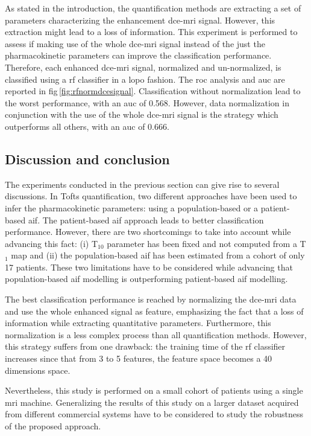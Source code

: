As stated in the introduction, the quantification methods are extracting a set of parameters characterizing the enhancement \ac{dce}-\ac{mri} signal.
However, this extraction might lead to a loss of information.
This experiment is performed to assess if making use of the whole \ac{dce}-\ac{mri} signal instead of the just the pharmacokinetic parameters can improve the classification performance.
Therefore, each enhanced \ac{dce}-\ac{mri} signal, normalized and un-normalized, is classified using a \ac{rf} classifier in a \ac{lopo} fashion.
The \ac{roc} analysis and \ac{auc} are reported in \acs{fig}\,\ref{fig:rfnormdcesignal}.
Classification without normalization lead to the worst performance, with an \ac{auc} of 0.568.
However, data normalization in conjunction with the use of the whole \ac{dce}-\ac{mri} signal is the strategy which outperforms all others, with an \ac{auc} of 0.666.


\subsection{Discussion and conclusion}\label{subsec:chp5:DCE-norm:dis-con}

The experiments conducted in the previous section can give rise to several discussions.
In Tofts quantification, two different approaches have been used to infer the pharmacokinetic parameters: using a population-based or a patient-based \ac{aif}.
The patient-based \ac{aif} approach leads to better classification performance.
However, there are two shortcomings to take into account while advancing this fact:
(i) T$_{10}$ parameter has been fixed and not computed from a T$_1$ map and
(ii) the population-based \ac{aif} has been estimated from a cohort of only 17 patients.
These two limitations have to be considered while advancing that population-based \ac{aif} modelling is outperforming patient-based \ac{aif} modelling.

The best classification performance is reached by normalizing the \ac{dce}-\ac{mri} data and use the whole enhanced signal as feature, emphasizing the fact that a loss of information while extracting quantitative parameters.
Furthermore, this normalization is a less complex process than all quantification methods.
However, this strategy suffers from one drawback: the training time of the \ac{rf} classifier increases since that from 3 to 5 features, the feature space becomes a 40 dimensions space.

Nevertheless, this study is performed on a small cohort of patients using a single \ac{mri} machine.
Generalizing the results of this study on a larger dataset acquired from different commercial systems have to be considered to study the robustness of the proposed approach.



